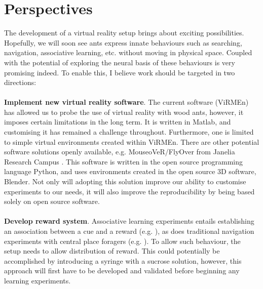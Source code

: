 \chapter{Perspectives}
\label{chap:persp}
The development of a virtual reality setup brings about exciting possibilities. Hopefully, we will soon see ants express innate behaviours such as searching, navigation, associative learning, etc. without moving in physical space. Coupled with the potential of exploring the neural basis of these behaviours is very promising indeed.
To enable this, I believe work should be targeted in two directions: \\ \\
\textbf{Implement new virtual reality software}. The current software (ViRMEn) has allowed us to probe the use of virtual reality with wood ants, however, it imposes certain limitations in the long term. It is written in Matlab, and customising it has remained a challenge throughout. Furthermore, one is limited to simple virtual environments created within ViRMEn. There are other potential software solutions openly available, e.g. MouseoVeR/FlyOver from Janelia Research Campus \autocite{Cohen2017MouseoVeRLaboratory}. This software is written in the open source programming language Python, and uses environments created in the open source 3D software, Blender. Not only will adopting this solution improve our ability to customise experiments to our needs, it will also improve the reproducibility by being based solely on open source software. \\ \\
\textbf{Develop reward system}. Associative learning experiments entails establishing an association between a cue and a reward (e.g. \cite{Fernandes2017a}), as does traditional navigation experiments with central place foragers (e.g. \cite{Buehlmann2018TheCharacteristics}). To allow such behaviour, the setup needs to allow distribution of reward. This could potentially be accomplished by introducing a syringe with a sucrose solution, however, this approach will first have to be developed and validated before beginning any learning experiments. 